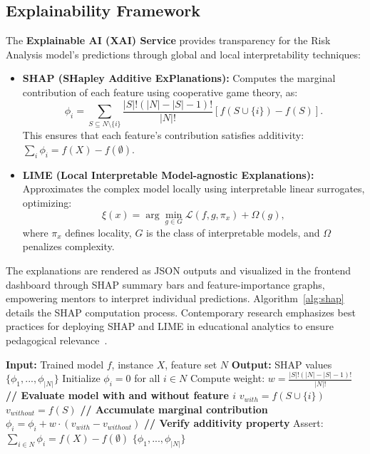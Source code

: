 \documentclass[conference]{IEEEtran}
\begin{document}
\subsection{Explainability Framework}
The \textbf{Explainable AI (XAI) Service} provides transparency for the Risk Analysis model's predictions through global and local interpretability techniques:
\begin{itemize}
    \item \textbf{SHAP (SHapley Additive ExPlanations):} Computes the marginal contribution of each feature using cooperative game theory, as:
    \begin{equation}
        \phi_i = \sum_{S \subseteq N \setminus \{i\}} \frac{|S|!(|N|-|S|-1)!}{|N|!}[f(S \cup \{i\}) - f(S)].
    \end{equation}
    This ensures that each feature's contribution satisfies additivity: $\sum_i \phi_i = f(X) - f(\emptyset)$.
    \item \textbf{LIME (Local Interpretable Model-agnostic Explanations):} Approximates the complex model locally using interpretable linear surrogates, optimizing:
    \begin{equation}
        \xi(x) = \arg\min_{g \in G} \mathcal{L}(f, g, \pi_x) + \Omega(g),
    \end{equation}
    where $\pi_x$ defines locality, $G$ is the class of interpretable models, and $\Omega$ penalizes complexity.
\end{itemize}
The explanations are rendered as JSON outputs and visualized in the frontend dashboard through SHAP summary bars and feature-importance graphs, empowering mentors to interpret individual predictions. Algorithm~\ref{alg:shap} details the SHAP computation process. Contemporary research emphasizes best practices for deploying SHAP and LIME in educational analytics to ensure pedagogical relevance~\cite{ref43}.

\begin{table}[H]
\centering
\begin{minipage}{0.48\textwidth}
\begin{algorithmic}[1]
\STATE \textbf{Input:} Trained model $f$, instance $X$, feature set $N$
\STATE \textbf{Output:} SHAP values $\{\phi_1, ..., \phi_{|N|}\}$
\STATE
\STATE Initialize $\phi_i = 0$ for all $i \in N$
\STATE
{}
        \STATE Compute weight: $w = \frac{|S|!(|N|-|S|-1)!}{|N|!}$
        \STATE
        \STATE \textbf{// Evaluate model with and without feature $i$}
        \STATE $v_{with} = f(S \cup \{i\})$
        \STATE $v_{without} = f(S)$
        \STATE
        \STATE \textbf{// Accumulate marginal contribution}
        \STATE $\phi_i = \phi_i + w \cdot (v_{with} - v_{without})$
    \ENDFOR
\ENDFOR
\STATE
\STATE \textbf{// Verify additivity property}
\STATE Assert: $\sum_{i \in N} \phi_i = f(X) - f(\emptyset)$
\STATE
\RETURN $\{\phi_1, ..., \phi_{|N|}\}$
\end{algorithmic}
\label{alg:shap}
\end{minipage}
\end{table}
\end{document}
